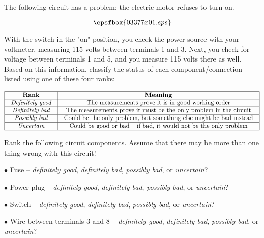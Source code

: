 

The following circuit has a problem: the electric motor refuses to turn on.

$$\epsfbox{03377x01.eps}$$

With the switch in the "on" position, you check the power source with your voltmeter, measuring 115 volts between terminals 1 and 3.  Next, you check for voltage between terminals 1 and 5, and you measure 115 volts there as well.  Based on this information, classify the status of each component/connection listed using one of these four ranks:


$$\vbox{\offinterlineskip
\halign{\strut
\vrule \quad\hfil # \ \hfil & 
\vrule \quad\hfil # \ \hfil \vrule \cr
\noalign{\hrule}
%
{\bf Rank} & {\bf Meaning} \cr
%
\noalign{\hrule}
%
{\it Definitely good} & The measurements prove it is in good working order \cr
%
\noalign{\hrule}
%
{\it Definitely bad} & The measurements prove it must be the only problem in the circuit \cr
%
\noalign{\hrule}
%
{\it Possibly bad} & Could be the only problem, but something else might be bad instead \cr
%
\noalign{\hrule}
%
{\it Uncertain} & Could be good or bad -- if bad, it would not be the only problem \cr
%
\noalign{\hrule}
} %
}$$ %

Rank the following circuit components.  Assume that there may be more than one thing wrong with this circuit!

\medskip
\item{$\bullet$} Fuse -- {\it definitely good}, {\it definitely bad}, {\it possibly bad}, or {\it uncertain}?
\item{$\bullet$} Power plug -- {\it definitely good}, {\it definitely bad}, {\it possibly bad}, or {\it uncertain}?
\item{$\bullet$} Switch -- {\it definitely good}, {\it definitely bad}, {\it possibly bad}, or {\it uncertain}?
\item{$\bullet$} Wire between terminals 3 and 8 -- {\it definitely good}, {\it definitely bad}, {\it possibly bad}, or {\it uncertain}?
\medskip






